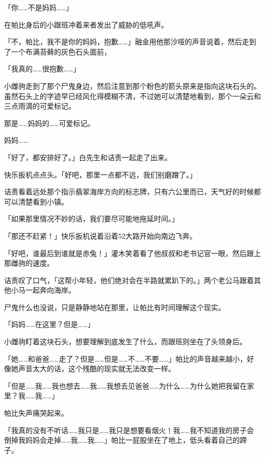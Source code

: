 「你……不是妈妈……」

在帕比身后的小跟班冲着来者发出了威胁的低吼声。

「不，帕比，我不是你的妈妈，抱歉……」融金用他那沙哑的声音说着，然后走到了一个布满苔藓的灰色石头面前，

「我真的……很抱歉……」

小雌驹走到了那个尸鬼身边，然后注意到那个粉色的箭头原来是指向这块石头的。虽然石头上的字迹早已经风化得模糊不清，不过她可以清楚地看到，那个一朵云和三点雨滴的可爱标记。

那是……妈妈的……可爱标记。

妈妈……{}

\horizonline


「好了，都安排好了。」白先生和诘责一起走了出来。

快乐扳机点点头。「好吧，那里一点都不远，我们别磨蹭了。」

诘责看着远处那个指示翡翠海岸方向的标志牌，只有六公里而已，天气好的时候都可以清楚看到小镇。

「如果那里情况不妙的话，我们要尽可能地拖延时间。」

「那还不赶紧！」快乐扳机说着沿着52大路开始向南边飞奔。

「好吧，谁最后到谁就是赤兔！」灌木笑着看了他叔叔和老书记官一眼，然后跟上那雌驹的速度。

诘责叹了口气，「这帮小年轻，他们绝对会在半路就累趴下的。」两个老公马跟着其他小马一起奔向海岸。

\horizonline


尸鬼什么也没说，只是静静地站在那里，让帕比有时间理解这个现实。

「妈妈……在这里？但是……」

小雌驹盯着这块石头，想要理解到底发生了什么，而跟班则坐在了头领身后。

「她……和爸爸……走了？但是……但是……不……不要……」帕比的声音越来越小，好像她声音太大的话，这个残酷的现实就无法改变一样。

「但是……我……我也想去……我……我想去见爸爸……为什么……为什么她把我留在家里？我……我……」

帕比失声痛哭起来。

「我真的没有不听话……我只是……我只是想要看烟火！我……我不知道我的房子会倒掉我妈妈会走掉……我……我……」帕比一屁股坐在了地上，低头看着自己的蹄子。

